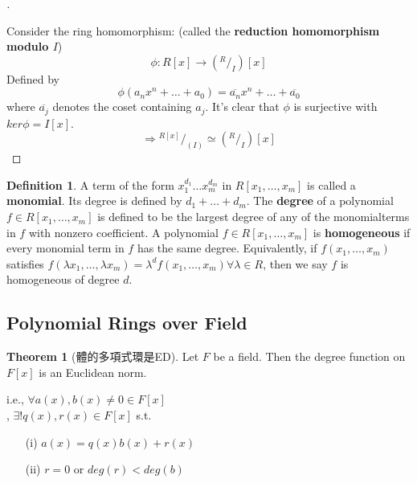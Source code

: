 \documentclass{article}
\theoremstyle{definition}
\newtheorem{thm}{Theorem}
\newtheorem{dfn}{Definition}
\newenvironment{proofs}[1][\proofname]{%
  \begin{proof}[#1]$ $\par\nobreak\ignorespaces
}{%
  \end{proof}
}
\newcommand*\quot[2]{{^{\textstyle #1}\big/_{\textstyle #2}}}
\begin{document}
  \begin{proofs}
	Consider the ring homomorphism: (called the \textbf{reduction homomorphism modulo $I$})
	$$\phi: R[x] \rightarrow (\quot{R}{I}) [x]$$
	Defined by 
	$$\phi(a_n x^n + \hdots + a_0) = \overline{a_n} x^n + \hdots + \overline{a_0}$$
	where $\overline{a_j}$ denotes the coset containing $a_j$. It's clear that $\phi$ is surjective with $ker \phi = I[x]$. 
	$$\Rightarrow \quot{R[x]}{(I)} \simeq (\quot{R}{I})[x]$$
  \end{proofs}
  
  \begin{dfn}
	A term of the form $x_1^{d_1} \hdots x_m^{d_m}$ in $R[x_1, \hdots , x_m]$ is called a \textbf{monomial}. Its degree is defined by $d_1 + \hdots + d_m$. The \textbf{degree} of a polynomial $f \in R[x_1, \hdots , x_m]$ is defined to be the largest degree of any of the monomialterms in $f$ with nonzero coefficient. A polynomial $f \in R[x_1, \hdots , x_m]$ is \textbf{homogeneous} if every monomial term in $f$ has the same degree. Equivalently, if $f(x_1, \hdots , x_m)$ satisfies $f(\lambda x_1, \hdots , \lambda x_m) = \lambda^d f(x_1, \hdots , x_m) \forall \lambda \in R$, then we say $f$ is homogeneous of degree $d$. 
  \end{dfn}

\subsection{Polynomial Rings over Field}

\begin{thm}[體的多項式環是ED]
	Let $F$ be a field. Then the degree function on $F[x]$ is an Euclidean norm. 
	
	i.e.,  $\forall a(x), b(x) \neq 0 \in F[x]$ \\, $\exists ! q(x), r(x) \in F[x]$ s.t. 
	  \begin{itemize}
		\item[(i)] $a(x) = q(x) b(x) + r(x)$
		\item[(ii)] $r = 0$ or $deg(r) < deg(b)$
	  \end{itemize}
\end{thm}
  
\end{document}
